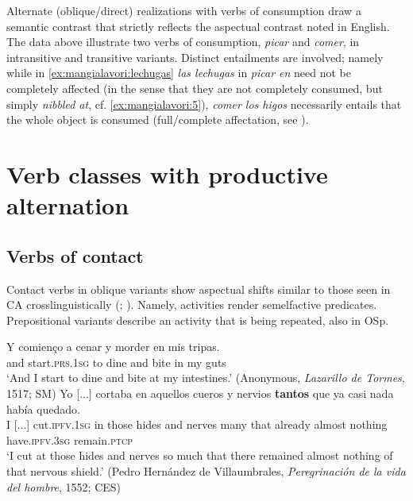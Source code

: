 \documentclass[output=paper,colorlinks,citecolor=brown,
]{langscibook}
\begin{document}
Alternate (oblique/direct) realizations with verbs of consumption draw a semantic contrast that strictly reflects the aspectual contrast noted in English. The data above illustrate two verbs of consumption, \textit{picar} and \textit{comer}, in intransitive and transitive variants. Distinct entailments are involved; namely while in  \ref{ex:mangialavori:lechugas} \textit{las lechugas} in \textit{picar en} need not be completely affected (in the sense that they are not completely consumed, but simply \textit{nibbled at}, cf.  \ref{ex:mangialavori:5}), \textit{comer los higos} necessarily entails that the whole object is consumed (full/complete affectation, see \citealt{Beavers2011}).

\section{Verb classes with productive alternation}\label{sec:mangialavori:3}
\subsection{Verbs of contact}\label{sec:mangialavori:3-1}

Contact verbs in oblique variants show aspectual shifts similar to those seen in CA crosslinguistically (\citealt{Vendler1957}; \citealt{Dowty1979}). Namely, activities render semelfactive predicates. Prepositional variants describe an activity that is being repeated, also in OSp.

\ea
  \ea
    \gll Y comienço a cenar y morder en mis tripas.\\
and start.\textsc{prs}.\textsc{1sg} to dine and bite in my guts\\
    \glt ‘And I start to dine and bite at my intestines.’ (Anonymous, \textit{Lazarillo de Tormes}, 1517; SM)
  \ex
    \gll Yo [...] cortaba en aquellos cueros y nervios \textbf{tantos} que ya casi nada había quedado.\\
I [...] cut.\textsc{ipfv}.\textsc{1sg} in those hides and nerves many that already almost nothing have.\textsc{ipfv}.\textsc{3sg} remain.\textsc{ptcp}\\
    \glt ‘I cut at those hides and nerves so much that there remained almost nothing of that nervous shield.’ (Pedro Hernández de Villaumbrales, \textit{Peregrinación de la vida del hombre}, 1552; CES)
  \z 
\z 
\end{document}
